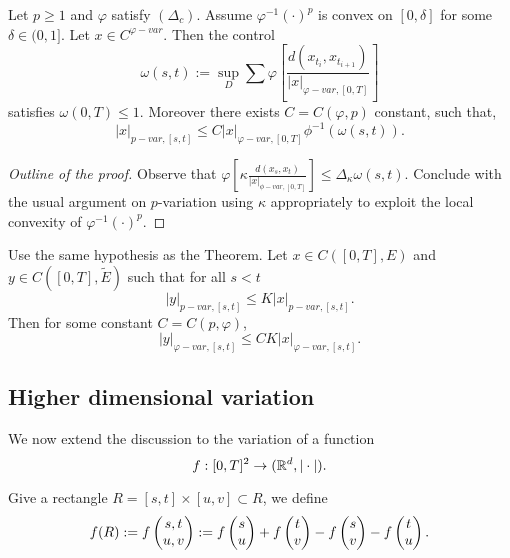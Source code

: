 \begin{theorem}
    Let $p \ge 1$ and $\varphi$ satisfy $(\Delta_c)$. Assume $\varphi^{-1}(\cdot)^p$ is convex on $[0,\delta]$ for some $\delta \in (0,1].$
    Let $x \in C^{\varphi-var}.$
    Then the control
    \begin{equation}
        \omega(s,t) := \sup_D \sum \varphi \left[ \frac{d(x_{t_i}, x_{t_{i+1}})}{|x|_{\varphi-var,[0,T]}} \right]
    \end{equation}
    satisfies $\omega(0,T) \le 1$. Moreover there exists $C = C(\varphi, p)$ constant, such that,
    \begin{equation}
        |x|_{p-var, [s,t]} \le C |x|_{\varphi-var,[0,T]} \phi^{-1}(\omega(s,t)).
    \end{equation}
\end{theorem}
\begin{proof}[Outline of the proof]
    Observe that $\varphi \left[ \kappa \frac{d(x_s, x_t)}{|x|_{\phi-var,[0,T]}} \right] \leq \Delta_\kappa \omega(s,t).$
    Conclude with the usual argument on $p$-variation using $\kappa$ appropriately to exploit the local convexity of $\varphi^{-1}(\cdot)^p$. 
\end{proof}

\begin{corollary}
    Use the same hypothesis as the Theorem. Let $x \in C([0,T],E)$ and $y \in C([0,T],\tilde{E})$ such that for all $s < t$
    \begin{equation}
        |y|_{p-var,[s,t]} \le K |x|_{p-var,[s,t]}.
    \end{equation}
    Then for some constant $C = C(p,\varphi)$,
    \begin{equation}
        |y|_{\varphi-var,[s,t]} \le C K |x|_{\varphi-var,[s,t]}.
    \end{equation}
\end{corollary}

\subsection{Higher dimensional variation}

We now extend the discussion to the variation of a function
\begin{equation}
    f:[0,T]^2 \rightarrow (\mathbb{R}^d, | \cdot |).
\end{equation}

\begin{definition}
    Give a rectangle $R = [s,t] \times [u,v] \subset R$, we define
    \begin{equation}
        f(R):= f \begin{pmatrix} s,t \\ u,v \end{pmatrix} := f \begin{pmatrix} s \\ u \end{pmatrix} + f \begin{pmatrix} t \\ v \end{pmatrix} - f \begin{pmatrix} s \\ v \end{pmatrix} - f \begin{pmatrix} t \\ u \end{pmatrix}.
    \end{equation} 
\end{definition}

